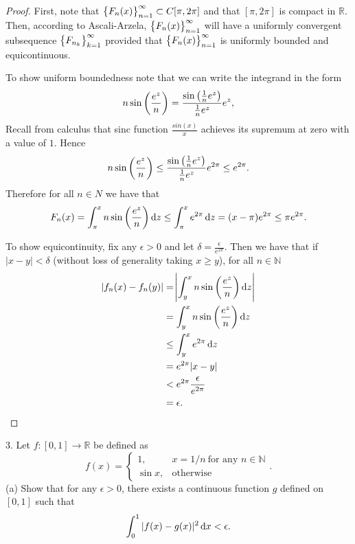 \documentclass{article}
\newcommand{\N}{\mathbb{N}}
\newcommand{\R}{\mathbb{R}}
\begin{document}
\begin{proof}

First, note that $\cbr{F_n(x)}_{n = 1}^\infty \subset C[\pi, 2 \pi]$ and
that $[\pi, 2 \pi]$ is compact in $\R$. Then, according to Ascali-Arzela,
$\cbr{F_n(x)}_{n = 1}^\infty$ will have a uniformly convergent
subsequence $\cbr{F_{n_k}}_{k = 1}^\infty$ provided that
$\cbr{F_n(x)}_{n = 1}^\infty$ is uniformly bounded and equicontinuous.

To show uniform boundedness note that we can write the integrand in the form
%
\begin{equation*}
    n \sin \del{\frac{e^z}{n}}
    = \frac{\sin \del{\frac{1}{n} e^z}}{\frac{1}{n} e^z} e^z
    ,
\end{equation*}
%
Recall from calculus that sinc function $\frac{sin(x)}{x}$ achieves its
supremum at zero with a value of $1$. Hence
%
\begin{equation*}
    n \sin \del{\frac{e^z}{n}}
        \leq \frac{\sin \del{\frac{1}{n} e^z}}{\frac{1}{n} e^z} e^{2 \pi}
        \leq e^{2 \pi}
    .
\end{equation*}
%
Therefore for all $n \in N$ we have that
\begin{equation*}
    F_n(x) = \int_\pi^x n \sin \del{\frac{e^z}{n}} \dif z
        \leq \int_\pi^x e^{2 \pi} \dif z
        = (x - \pi) e^{2 \pi}
        \leq \pi e^{2 \pi}
        .
\end{equation*}

To show equicontinuity, fix any $\epsilon > 0$ and let $\delta =
\frac{\epsilon}{e^{2 \pi}}$. Then we have that if $|x - y| < \delta$
(without loss of generality taking $x \geq y$), for all $n \in \N$
%
\begin{align*}
    |f_n(x) - f_n(y)|
        &= \envert{\int_y^x n \sin \del{\frac{e^z}{n}} \dif z} \\
        &= \int_y^x n \sin \del{\frac{e^z}{n}} \dif z \\
        &\leq \int_y^x e^{2 \pi} \dif z \\
        &= e^{2 \pi} |x - y| \\
        &< e^{2 \pi} \frac{\epsilon}{e^{2 \pi}} \\
        &= \epsilon
        .
\end{align*}

\end{proof}

\newpage

3. Let $f: [0, 1] \to \R$ be defined as
%
\begin{equation*}
    f(x)
    = \begin{cases}
        1, & x = 1/n \ \text{for any $n \in \N$} \\
        \sin x, & \text{otherwise}
    \end{cases}
    .
\end{equation*}
%
(a) Show that for any $\epsilon > 0$, there exists a continuous function
$g$ defined on $[0, 1]$ such that
%
\begin{equation*}
    \int_0^1 |f(x) - g(x)|^2 \dif x < \epsilon
    .
\end{equation*}
\end{document}
